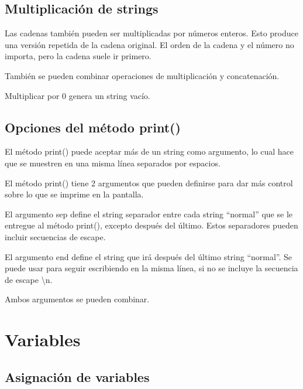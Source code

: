 \documentclass{report}
\newcommand{\doble}[1]{``#1''}
\begin{document}
\section{Multiplicación de strings}

Las cadenas también pueden ser multiplicadas por números enteros. Esto produce una versión repetida de la cadena original. El orden de la cadena y el número no importa, pero la cadena suele ir primero.


También se pueden combinar operaciones de multiplicación y concatenación.


Multiplicar por 0 genera un string vacío.


\section{Opciones del método print()}

El método print() puede aceptar más de un string como argumento, lo cual hace que se muestren en una misma línea separados por espacios.


El método print() tiene 2 argumentos que pueden definirse para dar más control sobre lo que se imprime en la pantalla.

El argumento sep define el string separador entre cada string \doble{normal} que se le entregue al método print(), excepto después del último. Estos separadores pueden incluir secuencias de escape.


El argumento end define el string que irá después del último string \doble{normal}. Se puede usar para seguir escribiendo en la misma línea, si no se incluye la secuencia de escape \textbackslash n.


Ambos argumentos se pueden combinar.


\clearpage\chapter{Variables}

\section{Asignación de variables}
\end{document}
